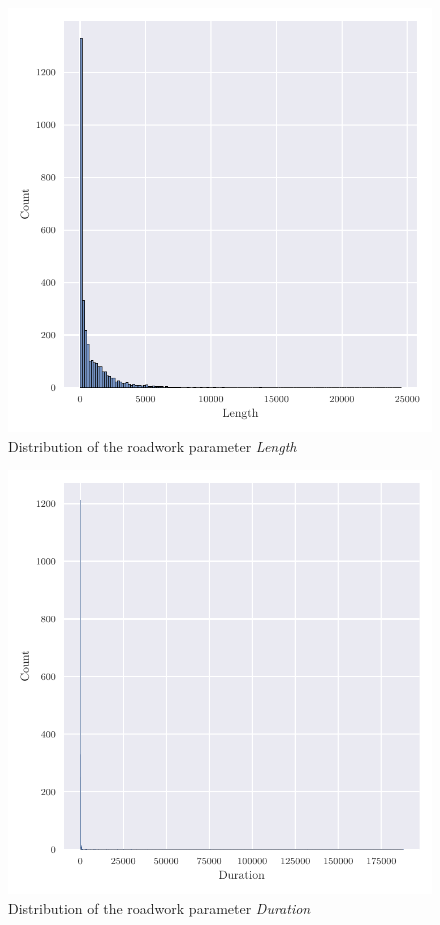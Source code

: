     \begin{figure}[ht!]
        \centering
        \includegraphics[scale=0.7]{CorrAnalysis/data/ArbIS/02_matched/plots/arbis_matched_dist_Length}
        \caption{Distribution of the roadwork parameter \textit{Length}}
        \label{img:arbis_matched_Length}
    \end{figure}

    \begin{figure}[ht!]
        \centering
        \includegraphics[scale=0.7]{CorrAnalysis/data/ArbIS/02_matched/plots/arbis_matched_dist_Duration}
        \caption{Distribution of the roadwork parameter \textit{Duration}}
        \label{img:arbis_matched_Duration}
    \end{figure}

